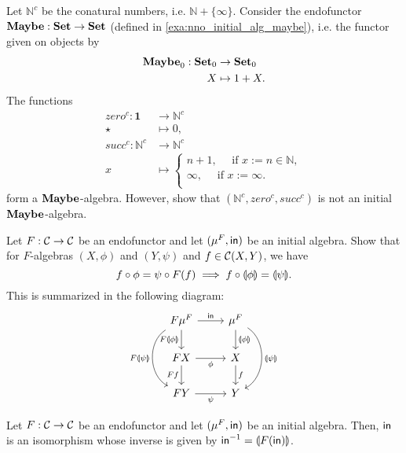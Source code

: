 \begin{exer}\label{exer:conatural_numbers_are_not_initial}
Let $\mathbb{N}^{c}$ be the conatural numbers, i.e. $\mathbb{N} + \{\infty\}$. Consider the endofunctor $\mathbf{Maybe} : \mathbf{Set} \to \mathbf{Set}$ (defined in \cref{exa:nno_initial_alg_maybe}), i.e. the functor given on objects by
\begin{align*}
  {\mathbf{Maybe}}_0 : {\mathbf{Set}}_0 &\to {\mathbf{Set}}_0
  \\
  X &\mapsto 1 + X.
\end{align*}
The functions
\begin{align*}
zero^{c} : \mathbf{1}&\to \mathbb{N}^{c} \\ 
           \star&\mapsto 0,\\
succ^{c} : \mathbb{N}^{c}&\to \mathbb{N}^{c} \\
          x & \mapsto 
\begin{cases}
n+1,\quad  \text{ if } x := n\in\mathbb{N},\\
\infty,\quad  \text{ if } x := \infty.\\
\end{cases}
\end{align*}
form a $\mathbf{Maybe}$-algebra. However, show that $(\mathbb{N}^{c},zero^{c},succ^{c})$ is not an initial $\mathbf{Maybe}$-algebra.
\end{exer}

\begin{exer}\label{exer:fusion-property}
  Let $F:\mathcal{C}\to\mathcal{C}$ be an endofunctor and let $(\mu^{F}, \mathsf{in})$ be an initial algebra. Show that
  for $F$-algebras $(X,\phi)$ and $(Y,\psi)$ and $f\in{\mathcal{C}}(X,Y)$, we have 
\[
f \circ \phi = \psi \circ F(f) \implies f \circ \llparenthesis \phi \rrparenthesis = \llparenthesis \psi \rrparenthesis.
\]
This is summarized in the following diagram:
\begin{equation}\label{eq:initial-f-alg-composition}
\begin{tikzcd}
F\Initalg{F} 
\arrow[r, "\In"] 
\arrow[d,swap, "F\catam{\phi}"]
\ar[dd, bend right=60, "F\catam{\psi}"']
&
\Initalg{F}
\arrow[d, "\catam{\phi}"]
\ar[dd, bend left=60, "\catam{\psi}"]
\\
FX
\arrow[r, swap, "\phi"]
\ar[d, "Ff"'] 
&
X \ar[d, "f"]
\\
FY \ar[r, "\psi"']
&
Y
\end{tikzcd}
\end{equation}
\end{exer}

\begin{thm}
  Let $F:\mathcal{C}\to\mathcal{C}$ be an endofunctor and let $(\mu^F, \mathsf{in})$ be an initial algebra. Then, $\mathsf{in}$ is an isomorphism whose inverse is given by $\mathsf{in} ^{-1} = \llparenthesis F(\mathsf{in}) \rrparenthesis$.
\end{thm}

